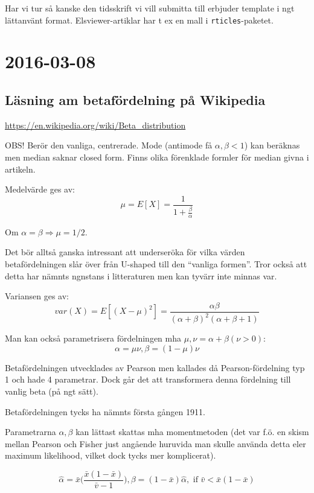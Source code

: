\documentclass[]{article}
\begin{document}
Har vi tur så kanske den tidsskrift vi vill submitta till erbjuder
template i ngt lättanvänt format. Elsviewer-artiklar har t ex en mall i
\texttt{rticles}-paketet.

\section{2016-03-08}\label{section-1}

\subsection{Läsning am betafördelning på
Wikipedia}\label{lasning-am-betafordelning-pa-wikipedia}

\url{https://en.wikipedia.org/wiki/Beta_distribution}

OBS! Berör den vanliga, centrerade. Mode (antimode få
\(\alpha, \beta < 1\)) kan beräknas men median saknar closed form. Finns
olika förenklade formler för median givna i artikeln.

Medelvärde ges av: \[\mu = E[X] = \frac{1}{1 + \frac{\beta}{\alpha}}\]

Om \(\alpha = \beta \Rightarrow \mu = 1/2\).

Det bör alltså ganska intressant att underseröka för vilka värden
betafördelningen slår över från U-shaped till den ``vanliga formen''.
Tror också att detta har nämnts ngnstans i litteraturen men kan tyvärr
inte minnas var.

Variansen ges av:
\[var(X) = E[(X-\mu)^2] = \frac{\alpha \beta}{(\alpha + \beta)^2(\alpha + \beta + 1)}\]

Man kan också parametrisera fördelningen mha
\(\mu, \nu = \alpha + \beta (\nu > 0)\):
\[\alpha = \mu \nu, \beta = (1 - \mu)\nu\]

Betafördelningen utvecklades av Pearson men kallades då
Pearson-fördelning typ 1 och hade 4 parametrar. Dock går det att
transformera denna fördelning till vanlig beta (på ngt sätt).

Betafördelningen tycks ha nämnts första gången 1911.

Parametrarna \(\alpha, \beta\) kan lättast skattas mha momentmetoden
(det var f.ö. en skism mellan Pearson och Fisher just angående huruvida
man skulle använda detta eler maximum likelihood, vilket dock tycks mer
komplicerat).

\[\hat{\alpha} = \bar{x}\big( \frac{\bar{x}(1-\bar{x})}{\bar{v}-1}\big), \beta = (1-\bar{x})\hat{\alpha}, \textrm{ if } \bar{v} < \bar{x}(1-\bar{x})\]
\end{document}

